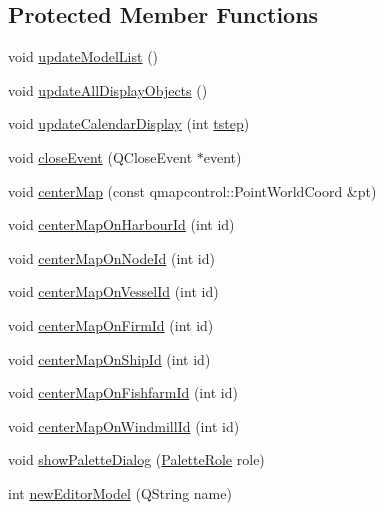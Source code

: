 \subsection*{Protected Member Functions}
\begin{DoxyCompactItemize}
\item 
void \mbox{\hyperlink{class_main_window_aa06b50e176df1f52690f9d2aa28ccc05}{update\+Model\+List}} ()
\item 
void \mbox{\hyperlink{class_main_window_a46495b52a8874968bd970b8d749f628c}{update\+All\+Display\+Objects}} ()
\item 
void \mbox{\hyperlink{class_main_window_a5e6eca6af849f6901c6388818168f431}{update\+Calendar\+Display}} (int \mbox{\hyperlink{thread__vessels_8cpp_a84bc73d278de929ec9974e1a95d9b23a}{tstep}})
\item 
void \mbox{\hyperlink{class_main_window_a4e20a4a065fbb0e4d3532a45a0a91425}{close\+Event}} (Q\+Close\+Event $\ast$event)
\item 
void \mbox{\hyperlink{class_main_window_addf9d10a5423b84eaf311d71e20d96de}{center\+Map}} (const qmapcontrol\+::\+Point\+World\+Coord \&pt)
\item 
void \mbox{\hyperlink{class_main_window_a2990247b4a0e67d36e241c7bf06f811f}{center\+Map\+On\+Harbour\+Id}} (int id)
\item 
void \mbox{\hyperlink{class_main_window_ab8c48330558b485bf1d1a30f7aee14ef}{center\+Map\+On\+Node\+Id}} (int id)
\item 
void \mbox{\hyperlink{class_main_window_aaa94a658cd218bc840ec1f7e427e92a5}{center\+Map\+On\+Vessel\+Id}} (int id)
\item 
void \mbox{\hyperlink{class_main_window_a867f8117eba785423f667376a83e21c0}{center\+Map\+On\+Firm\+Id}} (int id)
\item 
void \mbox{\hyperlink{class_main_window_a96a671f9eb8653486705fc3b97ba0d3a}{center\+Map\+On\+Ship\+Id}} (int id)
\item 
void \mbox{\hyperlink{class_main_window_a363ce78214d3f56759b8e0c13560a93b}{center\+Map\+On\+Fishfarm\+Id}} (int id)
\item 
void \mbox{\hyperlink{class_main_window_aca76f4f66cea851863a5f7501fcb336a}{center\+Map\+On\+Windmill\+Id}} (int id)
\item 
void \mbox{\hyperlink{class_main_window_a5fe8e78a3a189e96c1214510997546e6}{show\+Palette\+Dialog}} (\mbox{\hyperlink{palettemanager_8h_adf4610684920d9165d0d74c1ea45b269}{Palette\+Role}} role)
\item 
int \mbox{\hyperlink{class_main_window_a11c31a7e6ec68b8146f514fe99ae7f4c}{new\+Editor\+Model}} (Q\+String name)

\end{DoxyCompactItemize}
